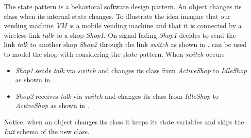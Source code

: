 The state pattern is a behavioral software design pattern. An object changes its class when its internal state changes. To illustrate the idea imagine that our vending machine \textit{VM} is a mobile vending machine and that it is connected by a wireless link $talk$ to a shop \textit{Shop1}. On signal fading \textit{Shop1} decides to send the link \textit{talk} to another shop \textit{Shop2} through the link \textit{switch} as shown in . \oz{} can be used to model the shop with considering the state pattern. When \textit{switch} occurs
\begin{itemize}
\item \textit{Shop1} sends \textit{talk} via \textit{switch} and changes its class from \textit{ActiveShop} to \textit{IdleShop} as shown in .
\item \textit{Shop2} receives \textit{talk} via  \textit{switch} and changes its class from \textit{IdleShop} to \textit{ActiveShop} as shown in .
\end{itemize}
Notice, when an object changes its class it keeps its state variables and skips the \textit{Init} schema of the new class.






